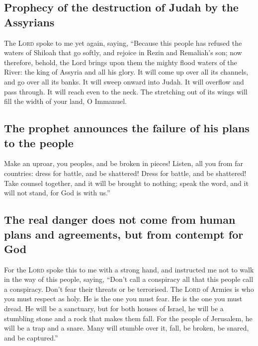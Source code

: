 \hypertarget{prophecy-of-the-destruction-of-judah-by-the-assyrians}{%
\subsection{Prophecy of the destruction of Judah by the
Assyrians}\label{prophecy-of-the-destruction-of-judah-by-the-assyrians}}

 The \textsc{Lord} spoke to me yet again, saying,
 ``Because this people has refused the waters of Shiloah
that go softly, and rejoice in Rezin and Remaliah's son; 
now therefore, behold, the Lord brings upon them the mighty flood waters
of the River: the king of Assyria and all his glory. It will come up
over all its channels, and go over all its banks.  It will
sweep onward into Judah. It will overflow and pass through. It will
reach even to the neck. The stretching out of its wings will fill the
width of your land, O Immanuel.

\hypertarget{the-prophet-announces-the-failure-of-his-plans-to-the-people}{%
\subsection{The prophet announces the failure of his plans to the
people}\label{the-prophet-announces-the-failure-of-his-plans-to-the-people}}

 Make an uproar, you peoples, and be broken in pieces!
Listen, all you from far countries: dress for battle, and be shattered!
Dress for battle, and be shattered!  Take counsel
together, and it will be brought to nothing; speak the word, and it will
not stand, for God is with us.''

\hypertarget{the-real-danger-does-not-come-from-human-plans-and-agreements-but-from-contempt-for-god}{%
\subsection{The real danger does not come from human plans and
agreements, but from contempt for
God}\label{the-real-danger-does-not-come-from-human-plans-and-agreements-but-from-contempt-for-god}}

 For the \textsc{Lord} spoke this to me with a strong
hand, and instructed me not to walk in the way of this people, saying,
 ``Don't call a conspiracy all that this people call a
conspiracy. Don't fear their threats or be terrorised. 
The \textsc{Lord} of Armies is who you must respect as holy. He is the
one you must fear. He is the one you must dread.  He will
be a sanctuary, but for both houses of Israel, he will be a stumbling
stone and a rock that makes them fall. For the people of Jerusalem, he
will be a trap and a snare.  Many will stumble over it,
fall, be broken, be snared, and be captured.''

